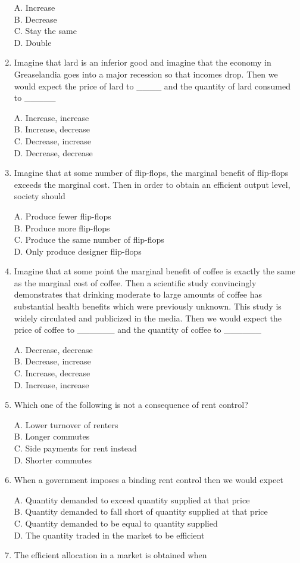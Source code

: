 \documentclass[
]{book}
\begin{document}
\begin{enumerate}
  A. Increase\\
  B. Decrease\\
  C. Stay the same\\
  D. Double
\item
  Imagine that lard is an inferior good and imagine that the economy in Greaselandia goes into a major recession so that incomes drop. Then we would expect the price of lard to \_\_\_\_ and the quantity of lard consumed to \_\_\_\_\_

  A. Increase, increase\\
  B. Increase, decrease\\
  C. Decrease, increase\\
  D. Decrease, decrease
\item
  Imagine that at some number of flip-flops, the marginal benefit of flip-flops exceeds the marginal cost. Then in order to obtain an efficient output level, society should

  A. Produce fewer flip-flops\\
  B. Produce more flip-flops\\
  C. Produce the same number of flip-flops\\
  D. Only produce designer flip-flops
\item
  Imagine that at some point the marginal benefit of coffee is exactly the same as the marginal cost of coffee. Then a scientific study convincingly demonstrates that drinking moderate to large amounts of coffee has substantial health benefits which were previously unknown. This study is widely circulated and publicized in the media. Then we would expect the price of coffee to \_\_\_\_\_\_ and the quantity of coffee to \_\_\_\_\_\_

  A. Decrease, decrease\\
  B. Decrease, increase\\
  C. Increase, decrease\\
  D. Increase, increase
\item
  Which one of the following is not a consequence of rent control?

  A. Lower turnover of renters\\
  B. Longer commutes\\
  C. Side payments for rent instead\\
  D. Shorter commutes
\item
  When a government imposes a binding rent control then we would expect

  A. Quantity demanded to exceed quantity supplied at that price\\
  B. Quantity demanded to fall short of quantity supplied at that price\\
  C. Quantity demanded to be equal to quantity supplied\\
  D. The quantity traded in the market to be efficient
\item
  The efficient allocation in a market is obtained when


\end{enumerate}
\end{document}
